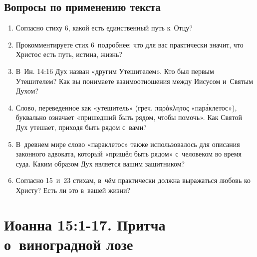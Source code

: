 \documentclass[a4paper,12pt]{article}
\begin{document}
\subsection*{Вопросы по применению текста} 
\begin{enumerate}
    \item Согласно стиху 6, какой есть единственный путь к~Отцу? 
    
    \myline
    
    \myline
    \item Прокомментируете стих 6~подробнее: что для вас практически значит, что Христос есть путь, истина, жизнь? 
    
    \myline
    
    \myline
    \item В~Ин. 14:16 Дух назван «другим Утешителем». Кто был первым Утешителем? Как вы понимаете взаимоотношения между Иисусом и~Святым Духом? 
    
    \myline
    
    \myline
    \item Слово, переведенное как «утешитель» (греч. παράκλητος «пар\'{а}клетос»), буквально означает «пришедший быть рядом, чтобы помочь». Как Святой Дух утешает, приходя быть рядом с~вами? 
    
    \myline
    
    \myline
    \item В~древнем мире слово «параклетос» также использовалось для описания законного адвоката, который «пришёл быть рядом» с~человеком во время суда. Каким образом Дух является вашим защитником? 
    
    \myline
    
    \myline
    \item Согласно 15~и~23 стихам, в~чём практически должна выражаться любовь ко Христу? Есть ли это в~вашей жизни?
    
    \myline
    
    \myline
\end{enumerate}



\section{Иоанна 15:1-17. Притча о~виноградной лозе}
\end{document}
